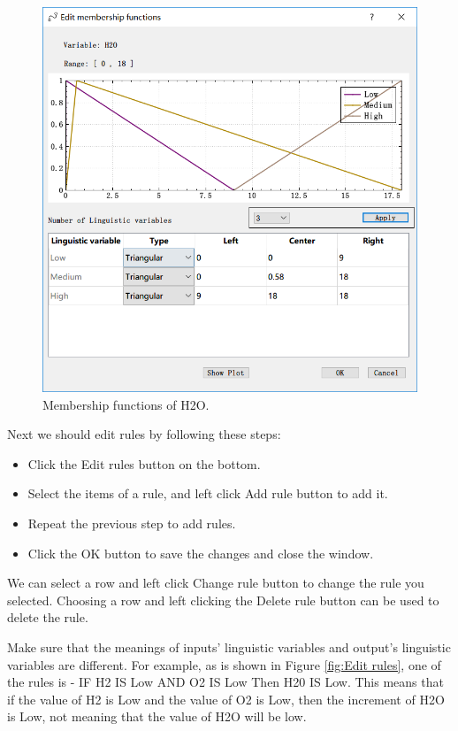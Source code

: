 \documentclass[journal,a4paper,onecolumn]{article}
\begin{document}
\begin{figure}[!hbt]
	\begin{center}
		\includegraphics[width=0.8\columnwidth]{fig9_2}
		\caption{Membership functions of H2O.}
		\label{fig:Membership functions of H2O}
	\end{center}
\end{figure}


\clearpage
Next we should edit rules by following these steps:
\begin{itemize}
	\item Click the Edit rules button on the bottom.
	\item Select the items of a rule, and left click Add rule button to add it.
	\item Repeat the previous step to add rules.
	\item Click the OK button to save the changes and close the window.
\end{itemize}

We can select a row and left click Change rule button to change the rule you selected. Choosing a row and left clicking the Delete rule button can be used to delete the rule.

Make sure that the meanings of inputs' linguistic variables and output's linguistic variables are different. For example, as is shown in Figure \ref{fig:Edit rules}, one of the rules is - IF H2 IS Low AND O2 IS Low Then H20 IS Low. This means that if the value of H2 is Low and the value of O2 is Low, then the increment of H2O is Low, not meaning that the value of H2O will be low.
\end{document}
